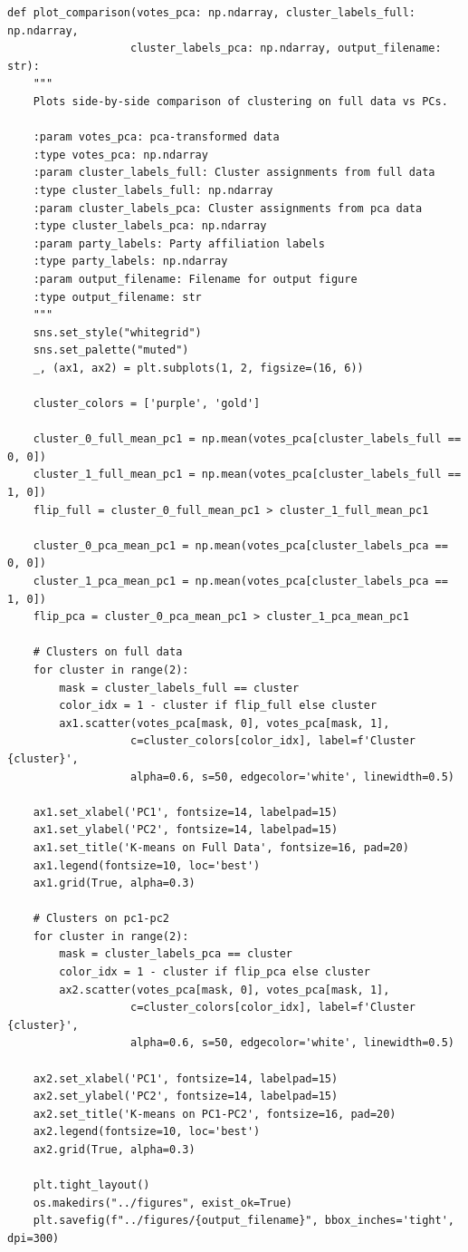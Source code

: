\begin{verbatim}
def plot_comparison(votes_pca: np.ndarray, cluster_labels_full: np.ndarray,
                   cluster_labels_pca: np.ndarray, output_filename: str):
    """
    Plots side-by-side comparison of clustering on full data vs PCs.
    
    :param votes_pca: pca-transformed data
    :type votes_pca: np.ndarray
    :param cluster_labels_full: Cluster assignments from full data
    :type cluster_labels_full: np.ndarray
    :param cluster_labels_pca: Cluster assignments from pca data
    :type cluster_labels_pca: np.ndarray
    :param party_labels: Party affiliation labels
    :type party_labels: np.ndarray
    :param output_filename: Filename for output figure
    :type output_filename: str
    """
    sns.set_style("whitegrid")
    sns.set_palette("muted")
    _, (ax1, ax2) = plt.subplots(1, 2, figsize=(16, 6))
    
    cluster_colors = ['purple', 'gold']
    
    cluster_0_full_mean_pc1 = np.mean(votes_pca[cluster_labels_full == 0, 0])
    cluster_1_full_mean_pc1 = np.mean(votes_pca[cluster_labels_full == 1, 0])
    flip_full = cluster_0_full_mean_pc1 > cluster_1_full_mean_pc1
    
    cluster_0_pca_mean_pc1 = np.mean(votes_pca[cluster_labels_pca == 0, 0])
    cluster_1_pca_mean_pc1 = np.mean(votes_pca[cluster_labels_pca == 1, 0])
    flip_pca = cluster_0_pca_mean_pc1 > cluster_1_pca_mean_pc1
    
    # Clusters on full data
    for cluster in range(2):
        mask = cluster_labels_full == cluster
        color_idx = 1 - cluster if flip_full else cluster
        ax1.scatter(votes_pca[mask, 0], votes_pca[mask, 1],
                   c=cluster_colors[color_idx], label=f'Cluster {cluster}',
                   alpha=0.6, s=50, edgecolor='white', linewidth=0.5)
    
    ax1.set_xlabel('PC1', fontsize=14, labelpad=15)
    ax1.set_ylabel('PC2', fontsize=14, labelpad=15)
    ax1.set_title('K-means on Full Data', fontsize=16, pad=20)
    ax1.legend(fontsize=10, loc='best')
    ax1.grid(True, alpha=0.3)
    
    # Clusters on pc1-pc2
    for cluster in range(2):
        mask = cluster_labels_pca == cluster
        color_idx = 1 - cluster if flip_pca else cluster
        ax2.scatter(votes_pca[mask, 0], votes_pca[mask, 1],
                   c=cluster_colors[color_idx], label=f'Cluster {cluster}',
                   alpha=0.6, s=50, edgecolor='white', linewidth=0.5)
    
    ax2.set_xlabel('PC1', fontsize=14, labelpad=15)
    ax2.set_ylabel('PC2', fontsize=14, labelpad=15)
    ax2.set_title('K-means on PC1-PC2', fontsize=16, pad=20)
    ax2.legend(fontsize=10, loc='best')
    ax2.grid(True, alpha=0.3)
    
    plt.tight_layout()
    os.makedirs("../figures", exist_ok=True)
    plt.savefig(f"../figures/{output_filename}", bbox_inches='tight', dpi=300)
\end{verbatim}

